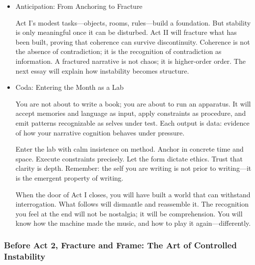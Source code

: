 \documentclass[11pt]{article}
\begin{document}
\begin{itemize}
No architecture stands without inhabitants. A memoir is completed by the reader’s cognition. Readers infer, fill ellipses, and stabilize ambiguity. They run part of the simulation in their own mental chronotopes. The writer who understands this designs for collaboration rather than control. Clarity replaces manipulation; restraint replaces coercion. Respect for readers is inseparable from respect for form.
\item Anticipation: From Anchoring to Fracture
\label{sec:orgaaf6cd4}

Act I’s modest tasks—objects, rooms, rules—build a foundation. But stability is only meaningful once it can be disturbed. Act II will fracture what has been built, proving that coherence can survive discontinuity. Coherence is not the absence of contradiction; it is the recognition of contradiction as information. A fractured narrative is not chaos; it is higher-order order. The next essay will explain how instability becomes structure.
\item Coda: Entering the Month as a Lab
\label{sec:orgdd6e10b}

You are not about to write a book; you are about to run an apparatus. It will accept memories and language as input, apply constraints as procedure, and emit patterns recognizable as selves under test. Each output is data: evidence of how your narrative cognition behaves under pressure.

Enter the lab with calm insistence on method. Anchor in concrete time and space. Execute constraints precisely. Let the form dictate ethics. Trust that clarity is depth. Remember: the self you are writing is not prior to writing—it is the emergent property of writing.

When the door of Act I closes, you will have built a world that can withstand interrogation. What follows will dismantle and reassemble it. The recognition you feel at the end will not be nostalgia; it will be comprehension. You will know how the machine made the music, and how to play it again—differently.
\end{itemize}
\subsubsection*{Before Act 2, Fracture and Frame: The Art of Controlled Instability}
\label{sec:orgf434f19}
\end{document}
